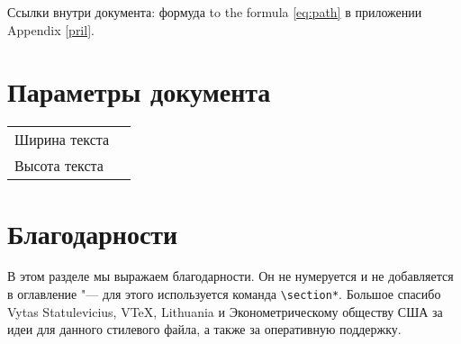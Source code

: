 \documentclass[final,pdftex]{epsilonj}
\numberwithin{equation}{section}
\begin{document}
Ссылки внутри документа: формуда to the formula \ref{eq:path} в приложении Appendix \ref{pril}.

\section{Параметры документа}

\begin{center}
	\begin{tabular}{ll}
		Ширина текста & \the\textwidth \\
		Высота текста & \the\textheight \\
	\end{tabular}
\end{center}


\section*{Благодарности}
В этом разделе мы выражаем благодарности. Он не нумеруется и не добавляется в оглавление "--- для этого используется команда \verb"\section*". Большое спасибо Vytas Statulevicius, VTeX, Lithuania и Эконометрическому обществу США за идеи для данного стилевого файла, а также за оперативную поддержку.
\end{document}

